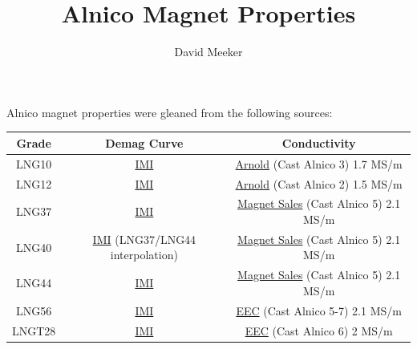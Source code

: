 \documentclass{article}
\begin{document}
\author{David Meeker}
\title{Alnico Magnet Properties}
\maketitle

\noindent Alnico magnet properties were gleaned from the following sources:

\begin{table}[htbp]
\centering
\begin{tabular}{|c|c|c|}
\hline
Grade & Demag Curve & Conductivity \\ \hline \hline
LNG10 & \href{https://web.archive.org/web/20230128141918/https://magnetsim.com/materials/cast-alnico}{IMI} &  \href{https://web.archive.org/web/20260323191135/https://www.arnoldmagnetics.com/wp-content/uploads/2017/10/Cast-Alnico-Permanent-Magnet-Brochure-101117.pdf}{Arnold} (Cast Alnico 3) 1.7 MS/m \\ \hline
LNG12 & \href{https://web.archive.org/web/20230128141918/https://magnetsim.com/materials/cast-alnico}{IMI} &  \href{https://web.archive.org/web/20260323191135/https://www.arnoldmagnetics.com/wp-content/uploads/2017/10/Cast-Alnico-Permanent-Magnet-Brochure-101117.pdf}{Arnold} (Cast Alnico 2) 1.5 MS/m \\ \hline
LNG37 & \href{https://web.archive.org/web/20230128141918/https://magnetsim.com/materials/cast-alnico}{IMI} &  \href{https://web.archive.org/web/20190325155903/http://www.magnetsales.com/Alnico/Alprops.htm}{Magnet Sales} (Cast Alnico 5) 2.1 MS/m \\ \hline
LNG40 & \href{https://web.archive.org/web/20230128141918/https://magnetsim.com/materials/cast-alnico}{IMI} (LNG37/LNG44 interpolation) &  \href{https://web.archive.org/web/20190325155903/http://www.magnetsales.com/Alnico/Alprops.htm}{Magnet Sales} (Cast Alnico 5) 2.1 MS/m \\ \hline
LNG44 & \href{https://web.archive.org/web/20230128141918/https://magnetsim.com/materials/cast-alnico}{IMI} &  \href{https://web.archive.org/web/20190325155903/http://www.magnetsales.com/Alnico/Alprops.htm}{Magnet Sales} (Cast Alnico 5) 2.1 MS/m \\ \hline
LNG56 & \href{https://web.archive.org/web/20230128141918/https://magnetsim.com/materials/cast-alnico}{IMI} &  \href{https://web.archive.org/web/20230629103524/https://cdn2.hubspot.net/hubfs/4788906/Electronenergy_December2018/Docs/EEC-Alnico-Material-Sheet.pdf}{EEC} (Cast Alnico 5-7) 2.1 MS/m \\ \hline
LNGT28 & \href{https://web.archive.org/web/20230128141918/https://magnetsim.com/materials/cast-alnico}{IMI} &  \href{https://web.archive.org/web/20230629103524/https://cdn2.hubspot.net/hubfs/4788906/Electronenergy_December2018/Docs/EEC-Alnico-Material-Sheet.pdf}{EEC} (Cast Alnico 6) 2 MS/m \\ \hline

\end{tabular}
\end{table}
\end{document}
